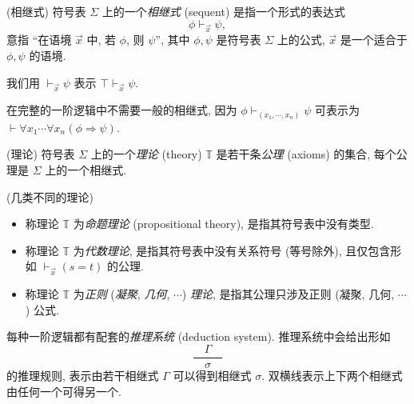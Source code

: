 \begin{definition}
	[label={sequents}]
	{(相继式)}
	符号表 $\Sigma$ 上的一个\emph{相继式} (sequent) 是指一个形式的表达式
	$$
	\phi \vdash_{\vec x} \psi,
	$$
	意指 ``在语境 $\vec x$ 中, 若 $\phi$, 则 $\psi$'', 其中 $\phi,\psi$ 是符号表 $\Sigma$ 上的公式,
	$\vec x$ 是一个适合于 $\phi,\psi$ 的语境.
	
	我们用 $\vdash_{\vec x} \psi$ 表示 $\top\vdash_{\vec x} \psi$.
\end{definition}

\begin{remark}
	[label={remark-full-first-order-logic-no-need-sequents}]
	{}
	在完整的一阶逻辑中不需要一般的相继式, 因为
	$\phi \vdash_{(x_1,\cdots,x_n)} \psi$ 可表示为
	$\vdash \forall x_1\cdots \forall x_n (\phi\Rightarrow \psi)$.
\end{remark}

\begin{definition}
	{(理论)}
	符号表 $\Sigma$ 上的一个\emph{理论} (theory) $\mathbb T$ 是若干条\emph{公理} (axioms) 的集合, 每个公理是 $\Sigma$ 上的一个相继式.
\end{definition}

\begin{definition}
	[label={kinds-of-theories}]
	{(几类不同的理论)}
	\begin{itemize}
		\item 称理论 $\mathbb T$ 为\emph{命题理论} (propositional theory), 是指其符号表中没有类型.
		\item 称理论 $\mathbb T$ 为\emph{代数理论}, 是指其符号表中没有关系符号 (等号除外), 且仅包含形如 $\vdash_{\vec x} (s=t)$ 的公理.
		\item 称理论 $\mathbb T$ 为\emph{正则} (\emph{凝聚}, \emph{几何}, $\cdots$) \emph{理论}, 是指其公理只涉及正则 (凝聚, 几何, $\cdots$) 公式.
	\end{itemize}
\end{definition}


\newcommand{\sqc}[2]{\frac{\quad #1 \quad}{\quad #2 \quad}}
\newcommand{\sqqc}[2]{
	\begin{array}
		{c}
		#1 \\ \hline \hline #2
	\end{array}
}

每种一阶逻辑都有配套的\emph{推理系统} (deduction system). 推理系统中会给出形如
$$
\sqc{\Gamma}{\sigma}
$$
的推理规则, 表示由若干相继式 $\Gamma$ 可以得到相继式 $\sigma$.
双横线表示上下两个相继式由任何一个可得另一个.

